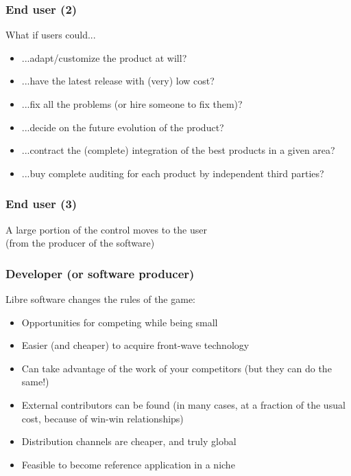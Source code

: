 \begin{frame}
\frametitle{End user (2)}

What if users could...

\begin{itemize}
\item ...adapt/customize the product at will?
\item ...have the latest release with (very) low cost?
\item ...fix all the problems (or hire someone to fix them)?
\item ...decide on the future evolution of the product?
\item ...contract the (complete) integration of the best products in a given area?
\item ...buy complete auditing for each product by independent third parties?
\end{itemize}
\end{frame}


\begin{frame}
\frametitle{End user (3)}

\begin{center}
{\LARGE A large portion of the control moves to the user \\
(from the producer of the software)}
\end{center}
\end{frame}


\begin{frame}
\frametitle{Developer (or software producer)}

Libre software changes the rules of the game:

\begin{itemize}
\item Opportunities for competing while being small
\item Easier (and cheaper) to acquire front-wave technology
\item Can take advantage of the work of your competitors (but they can do the same!)
\item External contributors can be found (in many cases, at a fraction of the usual cost, because of win-win relationships)
\item Distribution channels are cheaper, and truly global
\item Feasible to become reference application in a niche
\end{itemize}
\end{frame}


